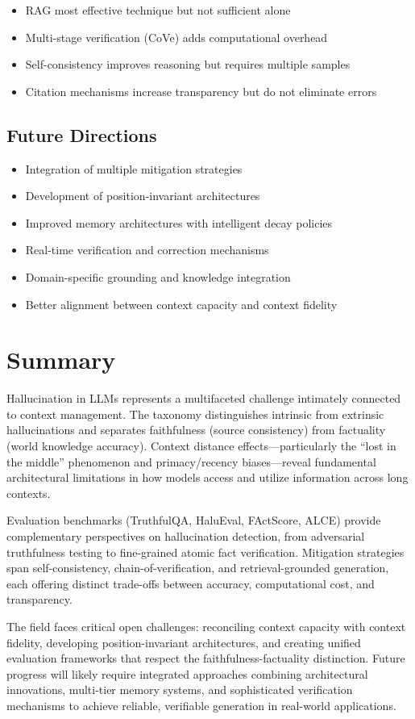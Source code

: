 \documentclass[11pt,letterpaper]{article}
\begin{document}
\begin{itemize}[leftmargin=*]
\item RAG most effective technique but not sufficient alone
\item Multi-stage verification (CoVe) adds computational overhead
\item Self-consistency improves reasoning but requires multiple samples
\item Citation mechanisms increase transparency but do not eliminate errors
\end{itemize}

\subsection{Future Directions}

\begin{itemize}[leftmargin=*]
\item Integration of multiple mitigation strategies
\item Development of position-invariant architectures
\item Improved memory architectures with intelligent decay policies
\item Real-time verification and correction mechanisms
\item Domain-specific grounding and knowledge integration
\item Better alignment between context capacity and context fidelity
\end{itemize}

\section{Summary}

Hallucination in LLMs represents a multifaceted challenge intimately connected to context management. The taxonomy distinguishes intrinsic from extrinsic hallucinations and separates faithfulness (source consistency) from factuality (world knowledge accuracy). Context distance effects---particularly the ``lost in the middle'' phenomenon and primacy/recency biases---reveal fundamental architectural limitations in how models access and utilize information across long contexts.

Evaluation benchmarks (TruthfulQA, HaluEval, FActScore, ALCE) provide complementary perspectives on hallucination detection, from adversarial truthfulness testing to fine-grained atomic fact verification. Mitigation strategies span self-consistency, chain-of-verification, and retrieval-grounded generation, each offering distinct trade-offs between accuracy, computational cost, and transparency.

The field faces critical open challenges: reconciling context capacity with context fidelity, developing position-invariant architectures, and creating unified evaluation frameworks that respect the faithfulness-factuality distinction. Future progress will likely require integrated approaches combining architectural innovations, multi-tier memory systems, and sophisticated verification mechanisms to achieve reliable, verifiable generation in real-world applications.
\end{document}
